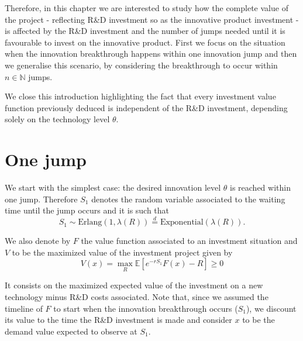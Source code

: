 


Therefore, in this chapter we are interested to study how the complete value of the project - reflecting R\&D investment so as the innovative product investment - is affected by the R\&D investment and the number of jumps needed until it is favourable to invest on the innovative product. First we focus on the situation when the innovation breakthrough happens within one innovation jump and then we generalise this scenario, by considering the breakthrough to occur within $n\in\mathds{N}$ jumps.


We close this introduction highlighting the fact that every investment value function previously deduced is independent of the R\&D investment, depending solely on the technology level $\theta$.

\section{One jump}
\label{section:max_1jump}

We start with the simplest case: the desired innovation level $\theta$ is reached within one jump.
Therefore $S_1$ denotes the random variable associated to the waiting time until the jump occurs and it is such that
$$S_1 \sim \text{Erlang}(1,\lambda(R)) \overset{d}{=} \text{Exponential}(\lambda(R)).$$

We also denote by $F$ the value function associated to an investment situation and $V$ to be the maximized value of the investment project given by
\begin{equation}
	V(x)=\max_R \mathds{E} [ e^{-rS_1}F(x)-R]\geq 0
	\label{max_V}
\end{equation}

It consists on the maximized expected value of the investment on a new technology minus R\&D costs associated. Note that, since we assumed the timeline of $F$ to start when the innovation breakthrough occurs ($S_1$), we discount its value to the time the R\&D investment is made and consider $x$ to be the demand value expected to observe at $S_1$.

